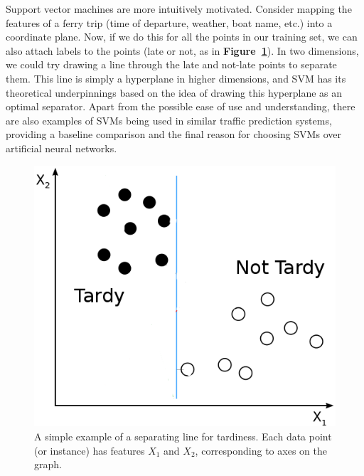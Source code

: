 \documentclass[11pt]{article} %
\begin{document}
Support vector machines are more intuitively motivated. Consider mapping the
features of a ferry trip (time of departure, weather, boat name, etc.) into a
coordinate plane.  Now, if we do this for all the points in our training set,
we can also attach labels to the points (late or not, as in 
\textbf{Figure~\ref{fig:basic_svm_data}}). In two dimensions, we
could try drawing a line through the late and not-late points to separate them.
This line is simply a hyperplane in higher dimensions, and SVM has its theoretical
underpinnings based on the idea of drawing this hyperplane as an optimal separator. 
Apart from the possible ease of use and understanding, there are also examples of 
SVMs being used in similar traffic prediction systems, providing a baseline 
comparison and the final reason for choosing SVMs over artificial neural networks.

\begin{figure}[h]
  \centering
  \includegraphics[scale=.5]{images/basic_svm_data.png}
  \caption{A simple example of a separating line for tardiness. 
      Each data point (or instance) has features $X_1$ and $X_2$, corresponding
      to axes on the graph.}
  \label{fig:basic_svm_data}
\end{figure}
\end{document}
